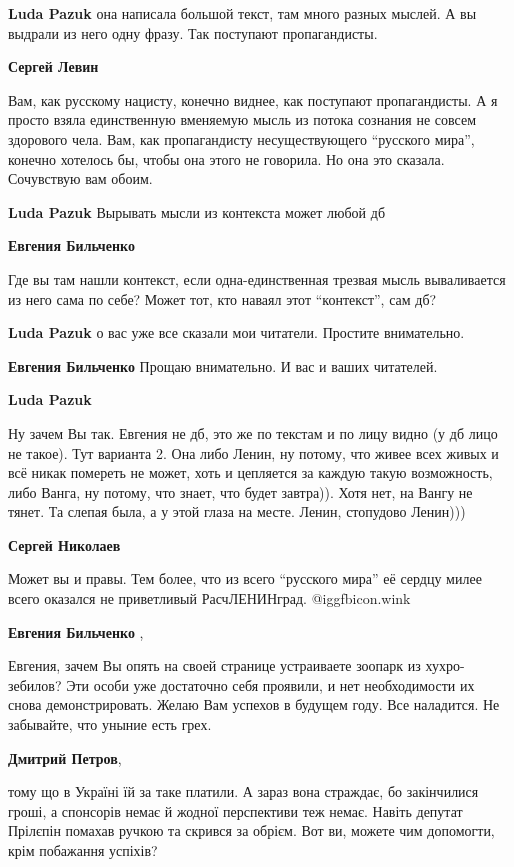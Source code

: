 \begin{itemize}
\begin{itemize}
\textbf{Luda Pazuk} она написала большой текст, там много разных мыслей. А вы выдрали из него одну фразу. Так поступают пропагандисты.

\textbf{Сергей Левин} 

Вам, как русскому нацисту, конечно виднее, как поступают пропагандисты. А я
просто взяла единственную вменяемую мысль из потока сознания не совсем
здорового чела. Вам, как пропагандисту несуществующего \enquote{русского мира}, конечно
хотелось бы, чтобы она этого не говорила. Но она это сказала. Сочувствую вам
обоим.

\textbf{Luda Pazuk} Вырывать мысли из контекста может любой дб

\textbf{Евгения Бильченко} 

Где вы там нашли контекст, если одна-единственная трезвая мысль вываливается из
него сама по себе? Может тот, кто наваял этот \enquote{контекст}, сам дб?

\textbf{Luda Pazuk} о вас уже все сказали мои читатели. Простите внимательно.

\textbf{Евгения Бильченко} Прощаю внимательно. И вас и ваших читателей.

\textbf{Luda Pazuk}

Ну зачем Вы так. Евгения не дб, это же по текстам и по лицу видно (у дб лицо не
такое). Тут варианта 2. Она либо Ленин, ну потому, что живее всех живых и всё никак
помереть не может, хоть и цепляется за каждую такую возможность, либо Ванга, ну
потому, что знает, что будет завтра)). Хотя нет, на Вангу не тянет. Та слепая была, а
у этой глаза на месте. Ленин, стопудово Ленин)))


\textbf{Сергей Николаев} 

Может вы и правы. Тем более, что из всего \enquote{русского мира} её сердцу милее всего
оказался не приветливый РасчЛЕНИНград.  @igg{fbicon.wink} 


\textbf{Евгения Бильченко} , 

Евгения, зачем Вы опять на своей странице устраиваете зоопарк из хухро-зебилов?
Эти особи уже достаточно себя проявили, и нет необходимости их снова
демонстрировать. Желаю Вам успехов в будущем году. Все наладится. Не забывайте,
что уныние есть грех.

\textbf{Дмитрий Петров}, 

тому що в Україні їй за таке платили. А зараз вона страждає, бо закінчилися
гроші, а спонсорів немає й жодної перспективи теж немає. Навіть депутат
Прілєпін помахав ручкою та скрився за обрієм. Вот ви, можете чим допомогти,
крім побажання успіхів?


\end{itemize}
\end{itemize}
